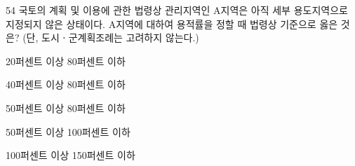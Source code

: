 \begin{question}{54}
국토의 계획 및 이용에 관한 법령상 관리지역인 A지역은 아직 세부 용도지역으로 지정되지 않은 상태이다. A지역에 대하여 용적률을 정할 때 법령상 기준으로 옳은 것은? (단, 도시ㆍ군계획조례는 고려하지 않는다.)
\begin{choices}
  \item 20퍼센트 이상 80퍼센트 이하
  \item 40퍼센트 이상 80퍼센트 이하
  \item 50퍼센트 이상 80퍼센트 이하
  \item 50퍼센트 이상 100퍼센트 이하
  \item 100퍼센트 이상 150퍼센트 이하
\end{choices}
\end{question}
